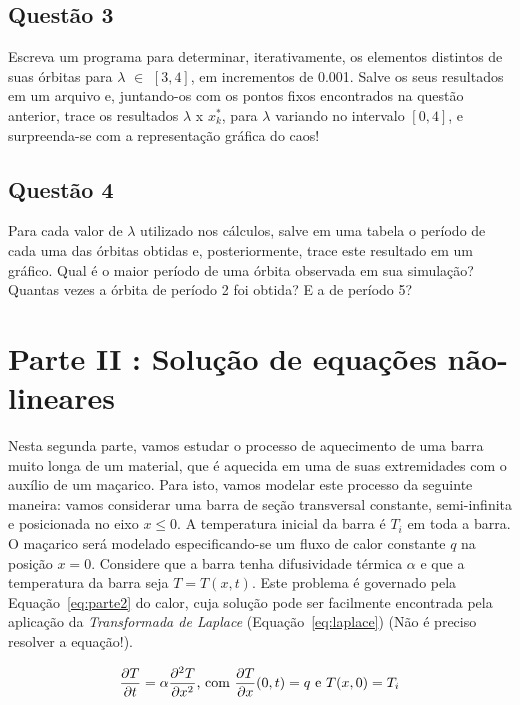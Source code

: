 \documentclass[12pt]{article}
\begin{document}
\subsection*{Questão 3}
\label{sec:p1q3}
Escreva um programa para determinar, iterativamente, os elementos distintos de suas órbitas para $\lambda$ $\in$ $[3, 4]$, em incrementos de 0.001. Salve os seus resultados em um arquivo e, juntando-os com os pontos fixos encontrados na questão anterior, trace os resultados $\lambda$ x $x_{k}^{*}$, para $\lambda$ variando no intervalo $[0, 4]$, e surpreenda-se com a representação gráfica do caos!

\subsection*{Questão 4}
\label{sec:p1q4}
Para cada valor de $\lambda$ utilizado nos cálculos, salve em uma tabela o período de cada uma das órbitas obtidas e, posteriormente, trace este resultado em um gráfico. Qual é o maior período de uma órbita observada em sua simulação? Quantas vezes a órbita de período 2 foi obtida? E a de período 5?

\section*{Parte II : Solução de equações não-lineares}
\label{sec:parte2}

Nesta segunda parte, vamos estudar o processo de aquecimento de uma barra muito longa de um material, que é aquecida em uma de suas extremidades com o auxílio de um maçarico. Para isto, vamos modelar este processo da seguinte maneira: vamos considerar uma barra de seção transversal constante, semi-infinita e posicionada no eixo $x \leq 0$. A temperatura inicial da barra é $T_{i}$ em toda a barra. O maçarico será modelado especificando-se um fluxo de calor constante $q$ na posição $x = 0$. Considere que a barra tenha difusividade térmica $\alpha$ e que a temperatura da barra seja $T = T (x, t)$. Este problema é governado pela Equação~\ref{eq:parte2} do calor, cuja solução pode ser facilmente encontrada pela aplicação da \textit{Transformada de Laplace} (Equação~\ref{eq:laplace}) (Não é preciso resolver a equação!).

\begin{equation}
\frac{\partial T}{\partial t} = \alpha \frac{\partial^{2} T}{\partial x^{2}} \hbox{, com } \frac{\partial T}{\partial x} (0,t) = q \hbox{ e } T(x,0) = T_{i}
\label{eq:parte2}
\end{equation}
\end{document}
